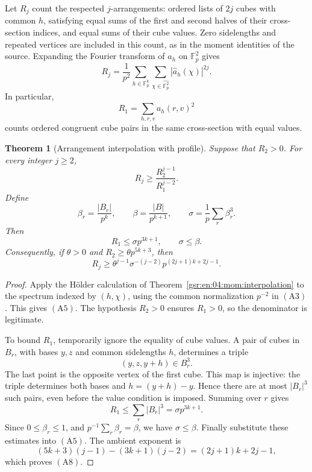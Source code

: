 \documentclass[11pt,letterpaper]{article}
\numberwithin{equation}{section}
\newtheorem{theorem}{Theorem}[section]
\theoremstyle{definition}
\theoremstyle{remark}
\newcommand{\F}{\mathbb F}
\newcommand{\1}{\mathbf 1}
\newcommand{\abs}[1]{\left|#1\right|}
\begin{document}
Let \(R_j\) count the respected \(j\)-arrangements: ordered
lists of \(2j\) cubes with common \(h\), satisfying equal sums
of the first and second halves of their cross-section indices,
and equal sums of their cube values.  Zero sidelengths and
repeated vertices are included in this count, as in the
moment identities of the source.  Expanding the Fourier
transform of \(a_h\) on \(\F_p^2\) gives
\[
 R_j=\frac1{p^2}
       \sum_{h\in\F_p^k}\sum_{\chi\in\widehat{\F_p^2}}
                     \abs{\widehat a_h(\chi)}^{2j}.
 \tag{A3}
\]
In particular,
\[
 R_1=\sum_{h,r,v}a_h(r,v)^2
 \tag{A4}
\]
counts ordered congruent cube pairs in the same cross-section
with equal values.

\begin{theorem}[Arrangement interpolation with profile]
\label{gsr:en:04:mom:arrangements}
Suppose that \(R_2>0\).  For every integer \(j\geq2\),
\[
 R_j\geq\frac{R_2^{j-1}}{R_1^{j-2}}.
 \tag{A5}
\]
Define
\[
 \beta_r=\frac{\abs{B_r}}{p^k},\qquad
 \beta=\frac{\abs B}{p^{k+1}},\qquad
 \sigma=\frac1p\sum_r\beta_r^3.
 \tag{A6}
\]
Then
\[
 R_1\leq\sigma p^{3k+1},\qquad \sigma\leq\beta.
 \tag{A7}
\]
Consequently, if \(\theta>0\) and \(R_2\geq\theta p^{5k+3}\), then
\[
 \boxed{\quad
 R_j\geq
 \theta^{j-1}\sigma^{-(j-2)}
               p^{(2j+1)k+2j-1}.
 \quad}
 \tag{A8}
\]
\end{theorem}

\begin{proof}
Apply the H\"older calculation of
Theorem~\ref{gsr:en:04:mom:interpolation} to the spectrum indexed by
\((h,\chi)\), using the common normalization \(p^{-2}\)
in \(\mathrm{(A3)}\).  This gives \(\mathrm{(A5)}\).
The hypothesis \(R_2>0\) ensures \(R_1>0\), so the
denominator is legitimate.

To bound \(R_1\), temporarily ignore the equality of cube
values.  A pair of cubes in \(B_r\), with bases \(y,z\)
and common sidelengths \(h\), determines a triple
\[
 (y,z,y+h)\in B_r^3.
 \tag{A9}
\]
The last point is the opposite vertex of the first cube.
This map is injective: the triple determines both bases
and \(h=(y+h)-y\).  Hence there are at most
\(\abs{B_r}^3\) such pairs, even before the value condition
is imposed.  Summing over \(r\) gives
\[
 R_1\leq\sum_r\abs{B_r}^3=\sigma p^{3k+1}.
\]
Since \(0\leq\beta_r\leq1\), and
\(p^{-1}\sum_r\beta_r=\beta\), we have \(\sigma\leq\beta\).
Finally substitute these estimates into
\(\mathrm{(A5)}\).  The ambient exponent is
\[
 (5k+3)(j-1)-(3k+1)(j-2)
       =(2j+1)k+2j-1,
\]
which proves \(\mathrm{(A8)}\).
\end{proof}
\end{document}
